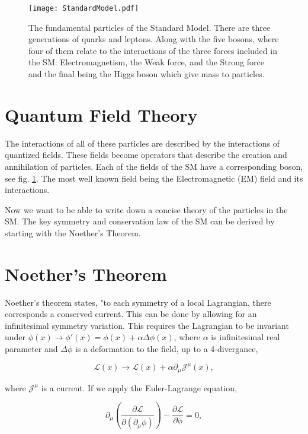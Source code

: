 \begin{figure}
 	\centering
	\texttt{[image: StandardModel.pdf]}
 	\caption{The fundamental particles of the Standard Model. There are three generations of quarks and leptons. Along with the five bosons, where four of them relate to the interactions of the three forces included in the SM: Electromagnetism, the Weak force, and the Strong force and the final being the Higgs boson which give mass to particles. }
 	\label{SMParticles} 
\end{figure}
 
 \section{Quantum Field Theory}
 \label{QFT}
 
 The interactions of all of these particles are described by the interactions of quantized fields. These fields become operators that describe the creation and annihilation of particles. Each of the fields of the SM have a corresponding boson, see fig. \ref{SMParticles}. The most well known field being the Electromagnetic (EM) field and its interactions. 
 
 Now we want to be able to write down a concise theory of the particles in the SM. The key symmetry and conservation law of the SM can be derived by starting with the Noether's Theorem.
 
 \section{Noether's Theorem}
 
 Noether's theorem states, "to each symmetry of a local Lagrangian, there corresponds a conserved current. This can be done by allowing for an infinitesimal symmetry variation. This requires the Lagrangian to be invariant under $\phi(x)\rightarrow\phi\prime(x)=\phi(x)+\alpha\Delta\phi(x)$, where $\alpha$ is infinitesimal real parameter and $\Delta\phi$ is a deformation to the field, up to a 4-divergance,
 
 \begin{equation}\label{LagrangeFluctuation}
 \mathcal{L}(x)\rightarrow\mathcal{L}(x)+\alpha\partial_\mu\mathcal{J}^\mu(x),
 \end{equation}
 
 where $\mathcal{J}^\mu$ is a current. If we apply the Euler-Lagrange equation,
 
 \begin{equation}
 \partial_\mu(\frac{\partial\mathcal{L}}{\partial(\partial_\mu\phi)})-\frac{\partial\mathcal{L}}{\partial\phi}=0,
 \end{equation}
 
